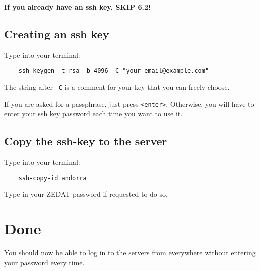 \documentclass{article}
\begin{document}
\textbf{If you already have an ssh key, SKIP 6.2!}

\subsection{Creating an ssh key}

Type into your terminal:

\begin{verbatim}
    ssh-keygen -t rsa -b 4096 -C "your_email@example.com"
\end{verbatim}

The string after \texttt{-C} is a comment for your key that you can freely choose.

If you are asked for a passphrase, just press \texttt{<enter>}. Otherwise, you will have to enter your ssh key password each time you want to use it.

\subsection{Copy the ssh-key to the server}

Type into your terminal:

\begin{verbatim}
    ssh-copy-id andorra
\end{verbatim}

Type in your ZEDAT password if requested to do so.

\section{Done}

You should now be able to log in to the servers from everywhere without entering your password every time.
\end{document}
